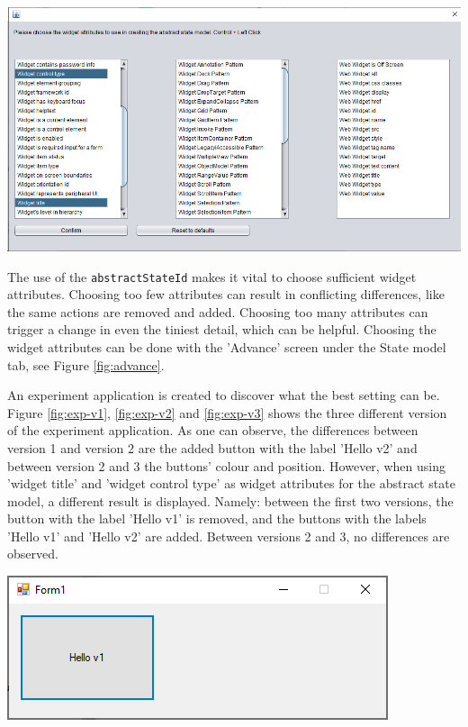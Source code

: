 \begingroup
\captionsetup{type=figure}
\includegraphics[scale=0.5]{pics/attributes-state-model.png}
\label{fig:advance}
\endgroup

The use of the \verb|abstractStateId| makes it vital to choose sufficient widget attributes. Choosing too few attributes can result in conflicting differences, like the same actions are removed and added. Choosing too many attributes can trigger a change in even the tiniest detail, which can be helpful. Choosing the widget attributes can be done with the 'Advance' screen under the State model tab, see Figure \ref{fig:advance}.

An experiment application is created to discover what the best setting can be. Figure \ref{fig:exp-v1}, \ref{fig:exp-v2} and \ref{fig:exp-v3} shows the three different version of the experiment application. As one can observe, the differences between version 1 and version 2 are the added button with the label 'Hello v2' and between version 2 and 3 the buttons' colour and position. However, when using 'widget title' and 'widget control type' as widget attributes for the abstract state model, a different result is displayed. Namely: between the first two versions, the button with the label 'Hello v1' is removed, and the buttons with the labels 'Hello v1' and 'Hello v2' are added. Between versions 2 and 3, no differences are observed.

\begingroup
\captionsetup{type=figure}
\includegraphics[scale=1]{pics/exp-v1.png}
\label{fig:exp-v1}
\endgroup

